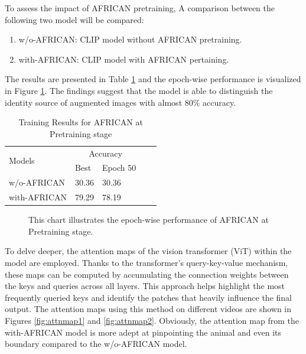 To assess the impact of AFRICAN pretraining, A comparison between the following two model will be compared: 

\begin{enumerate}
    \item w/o-AFRICAN: CLIP model without AFRICAN pretraining.
    \item with-AFRICAN: CLIP model with AFRICAN pertaining.
\end{enumerate}

The results are presented in Table \ref{tab:africanpretrainingresults} and the epoch-wise performance is visualized in Figure \ref{fig:tp_africanpretraining}. The findings suggest that the model is able to distinguish the identity source of augmented images with almost 80\% accuracy. 

\begin{table}[ht]
    \centering
    \caption{Training Results for AFRICAN at Pretraining stage}
    \label{tab:africanpretrainingresults}
    \begin{tabular}{lllll}
        \toprule
        \multirow{2}{*}{Models} & \multicolumn{2}{c}{Accuracy} \\
        \cmidrule{2-3} 
        {} &  Best & Epoch 50\\
        \midrule
        w/o-AFRICAN   & 30.36 & 30.36 \\
        with-AFRICAN  & 79.29 & 78.19 \\
        \bottomrule
    \end{tabular}
\end{table}

\begin{figure}[ht]
    \centering
    \resizebox{1.0\textwidth}{!}{}
    \caption[Accuracy of AFRICAN on each Epoch at Pretraining stage]{This chart illustrates the epoch-wise performance of AFRICAN at Pretraining stage.}
    \label{fig:tp_africanpretraining}
\end{figure}

To delve deeper, the attention maps of the vision transformer (ViT) within the model are employed. Thanks to the transformer's query-key-value mechanism, these maps can be computed by accumulating the connection weights between the keys and queries across all layers. This approach helps highlight the most frequently queried keys and identify the patches that heavily influence the final output. The attention maps using this method on different videos are shown in Figures \ref{fig:attnmap1} and \ref{fig:attnmap2}. Obviously, the attention map from the with-AFRICAN model is more adept at pinpointing the animal and even its boundary compared to the w/o-AFRICAN model.

